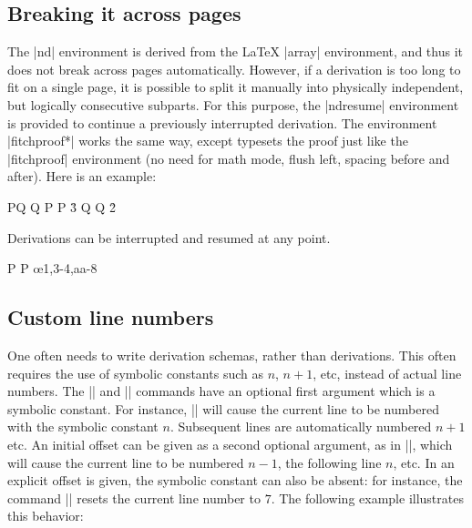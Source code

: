 \documentclass{ltxdoc}
\newcommand\NewIn[1]{\leavevmode
  \marginpar{\hfill\fbox{\fbox{New in #1}}\hspace*{1em}}\ignorespaces}
\begin{document}
\subsection{Breaking it across pages}\label{subsec-break}

The |nd| environment is derived from the {\LaTeX} |array|
environment, and thus it does not break across pages automatically. 
However, if a derivation is too long to fit on a single page, it is
possible to split it manually into physically independent, but
logically consecutive subparts. For this purpose, the |ndresume|
environment is provided to continue a previously interrupted
derivation. 
\NewIn{1.0} The environment |fitchproof*| works the same way, except typesets the
proof just like the |fitchproof| environment (no need for math mode,
flush left, spacing before and after). Here is an example:

\begin{LTXexample}
\begin{fitchproof}
    {P\vee Q}
    {\neg Q}
  \open
   {P}
   {P}      \r{3}
  \close
  \open
   {Q}
   {\neg Q} \r{2}
\end{fitchproof}
Derivations can be interrupted and 
resumed at any point.
\begin{fitchproof*}
   {\bot}  
   {P}     
  \close
   {P}     \oe{1,3-4,aa-8}
\end{fitchproof*}
\end{LTXexample}


\subsection{Custom line numbers}\label{subsec-customline}

One often needs to write derivation schemas, rather than derivations.
This often requires the use of symbolic constants such as $n$, $n+1$,
etc, instead of actual line numbers. The |\have| and |\hypo|
commands have an optional first argument which is a symbolic constant.
For instance, |\have[n]| will cause the current line to be
numbered with the symbolic constant $n$. Subsequent lines are
automatically numbered $n+1$ etc. An initial offset can be given as a
second optional argument, as in |\have[n][-1]|, which will cause
the current line to be numbered $n-1$, the following line $n$, etc. In
an explicit offset is given, the symbolic constant can also be absent:
for instance, the command |\have[][7]| resets the current line
number to $7$. The following example illustrates this behavior:
\end{document}
